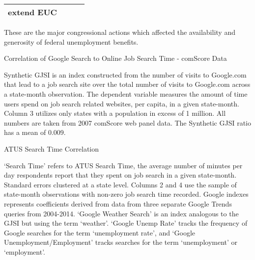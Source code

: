\documentclass[12pt]{article}
\begin{document}
\begin{spacing}{2}
\begin{sidewaystable}
\begin{threeparttable}
\begin{tabular}{llll}
extend EUC &  &   & \\
\hline
\end{tabular}
\begin{tablenotes}
\item These are the major congressional actions which affected the availability and generosity of federal unemployment benefits.
\end{tablenotes}
\end{threeparttable}
\end{sidewaystable}


\begin{sidewaystable}[H]
\caption{Correlation of Google Search to Online Job Search Time - comScore Data}
\label{tab:comScore}
\begin{center}

\begin{tablenotes}
\item Synthetic GJSI is an index constructed from the number of visits to Google.com that lead to a job search site over the total number of visits to Google.com across a state-month observation. The dependent variable measures the amount of time users spend on job search related websites, per capita, in a given state-month. Column 3 utilizes only states with a population in excess of 1 million. All numbers are taken from 2007 comScore web panel data. The Synthetic GJSI ratio has a mean of 0.009.
\end{tablenotes}
\end{center}
\end{sidewaystable}

\begin{sidewaystable}[H]
\caption{ATUS Search Time Correlation}
\label{tab:atuscorr}
\begin{center}

\begin{tablenotes}
\item `Search Time' refers to ATUS Search Time, the average number of minutes per day respondents report that they spent on job search in a given state-month. Standard errors clustered at a state level. Columns 2 and 4 use the sample of state-month observations with non-zero job search time recorded. Google indexes represents coefficients derived from data from three separate Google Trends queries from 2004-2014. `Google Weather Search' is an index analogous to the GJSI but using the term `weather'. `Google Unemp Rate' tracks the frequency of Google searches for the term `unemployment rate', and `Google Unemployment/Employment' tracks searches for the term `unemployment' or `employment'.
\end{tablenotes}
\end{center}
\end{sidewaystable}


\end{spacing}
\end{document}
